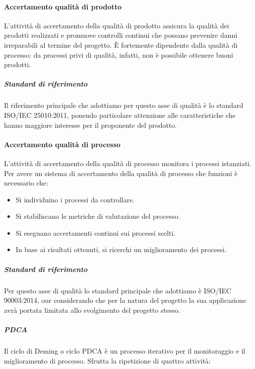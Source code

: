 \documentclass[../norme-di-progetto.tex]{subfiles}
\begin{document}
\paragraph{Accertamento qualità di prodotto}%
\label{par:accertamento_qualita_di_prodotto}
L'attività di accertamento della qualità di prodotto assicura la qualità dei prodotti realizzati e promuove controlli continui che possano prevenire danni irreparabili al termine del progetto.
È fortemente dipendente dalla qualità di processo: da processi privi di qualità, infatti, non è possibile ottenere buoni prodotti.

\subparagraph{Standard di riferimento}%
\label{subp:accertamento_qualita_di_prodotto/standard_di_riferimento}

Il riferimento principale che adottiamo per questo asse di qualità è lo standard ISO/IEC 25010:2011, ponendo particolare attenzione alle caratteristiche che hanno maggiore interesse per il proponente del prodotto.

\paragraph{Accertamento qualità di processo}%
\label{par:accertamento_qualita_di_processo}
L'attività di accertamento della qualità di processo monitora i processi istanziati. Per avere un sistema di accertamento della qualità di processo che funzioni è necessario che:

\begin{itemize}
  \item Si individuino i processi da controllare.
  \item Si stabiliscano le metriche di valutazione del processo.
  \item Si eseguano accertamenti continui sui processi scelti.
  \item In base ai risultati ottenuti, si ricerchi un miglioramento dei processi.
\end{itemize}

\subparagraph{Standard di riferimento}%
\label{subp:accertamento_qualita_di_processo/standard_di_riferimento}

Per questo asse di qualità lo standard principale che adottiamo è ISO/IEC 90003:2014, our considerando che per la natura del progetto la sua applicazione avrà portata limitata allo svolgimento del progetto stesso.

\subparagraph{PDCA}%
\label{subp:PDCA}
Il ciclo di Deming o ciclo PDCA è un processo iterativo per il monitoraggio e il miglioramento di processo. Sfrutta la ripetizione di quattro attività:
\end{document}
